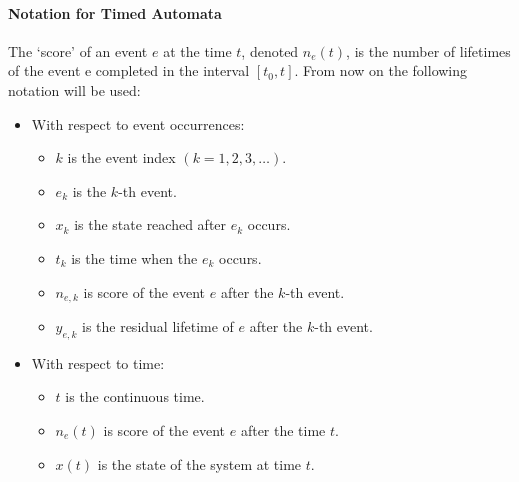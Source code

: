 \documentclass[12pt,a4paper]{article}
\begin{document}
\paragraph{Notation for Timed Automata}
The `score’ of an event $e$ at the time $t$, denoted $n_e (t)$, is the number of lifetimes of the event e completed in the interval $[t_0,t]$. From now on the following notation will be used:
\begin{itemize}
\item With respect to event occurrences:
	\begin{itemize}
	\item $k$ is the event index $(k=1,2,3,\dots)$.
	\item $e_k$ is the $k$-th event.
	\item $x_k$ is the state reached after $e_k$ occurs.
	\item $t_k$ is the time when the $e_k$ occurs.
	\item $n_{e,k}$ is score of the event $e$ after the $k$-th event.
	\item $y_{e,k}$ is the residual lifetime of $e$ after the $k$-th event.
	\end{itemize} 
\item With respect to time:
	\begin{itemize}
	\item $t$ is the continuous time.
	\item $n_{e}(t)$ is score of the event $e$ after the time $t$.
	\item $x(t)$ is the state of the system at time $t$.
	\end{itemize} 
\end{itemize}
\end{document}
